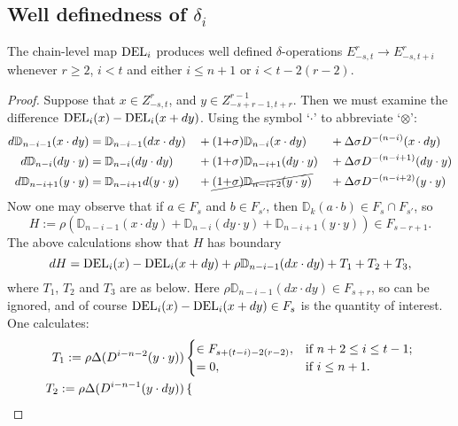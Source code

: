 \documentclass[10pt]{article}
\newcommand{\twist}{\sigma}
\begin{document}
\begin{AdamsSSEQ operations final}
\subsection{Well definedness of $\delta_i$}
\begin{prop}
The chain-level map $\textup{DEL}_i$ produces well defined $\delta$-operations $E^r_{-s,t}\to E^r_{-s,t+i}$ whenever $r\geq2$, $i<t$ and either $i\leq n+1$ or $i<t-2(r-2)$.
\end{prop}
\begin{proof}
Suppose that $x\in Z^r_{-s,t}$, and $y\in Z^{r-1}_{-s+r-1,t+r}$. Then we must examine the difference $\textup{DEL}_i(x)-\textup{DEL}_i(x+dy)$.
Using the symbol `$\cdot$' to abbreviate `$\otimes$':
\small
\begin{alignat*}{4}
d\mathbb{D}_{n-i-1}(x\cdot dy)&=
{\mathbb{D}_{n-i-1}(dx\cdot dy)}&&+
(1{+}\twist)\mathbb{D}_{n-i}(x\cdot dy)&&+
\Delta\twist D^{-(n-i)}(x\cdot dy)\\
d\mathbb{D}_{n-i}(dy\cdot y)&=
\mathbb{D}_{n-i}(dy\cdot dy)&&+
(1{+}\twist)\mathbb{D}_{n-i+1}(dy\cdot y)&&+
\Delta\twist D^{-(n-i+1)}(dy\cdot y)\\
d\mathbb{D}_{n-i+1}(y\cdot y)&=
\mathbb{D}_{n-i+1}d(y\cdot y)&&+
\cancel{(1{+}\twist)\mathbb{D}_{n-i+2}(y\cdot y)}&&+
\Delta\twist D^{-(n-i+2)}(y\cdot y)
\end{alignat*}
\normalsize
Now one may observe that if $a\in F_s$ and $b\in F_{s'}$, then $\mathbb{D}_k(a\cdot b)\in F_s\cap F_{s'}$, so
\[H:=\rho(\mathbb{D}_{n-i-1}(x\cdot dy)+\mathbb{D}_{n-i}(dy\cdot y)+\mathbb{D}_{n-i+1}(y\cdot y))\in F_{s-r+1}.\]
The above calculations show that $H$ has boundary
\small
\[dH=\textup{DEL}_i(x)-\textup{DEL}_i(x+dy) +\rho\mathbb{D}_{n-i-1}(dx\cdot dy)+T_1+T_2+T_3,\]
\normalsize
where $T_1$, $T_2$ and $T_3$ are as below.
Here $\rho\mathbb{D}_{n-i-1}(dx\cdot dy)\in F_{s+r}$, so can be ignored, and of course $\textup{DEL}_i(x)-\textup{DEL}_i(x+dy)\in F_s$ is the quantity of interest. One calculates:
\begin{align*}
T_1:=\rho\Delta(D^{i-n-2}(y\cdot y))&\begin{cases}
\in F_{s+(t-i)-2(r-2)},&\textup{if }n+2\leq i\leq t-1;\\
=0,&\textup{if }i\leq n+1.
\end{cases}
\\
T_2:=\rho\Delta(D^{i-n-1}(y\cdot dy))&\begin{cases}

\end{cases}
\end{align*}
\end{proof}
\end{AdamsSSEQ operations final}
\end{document}
